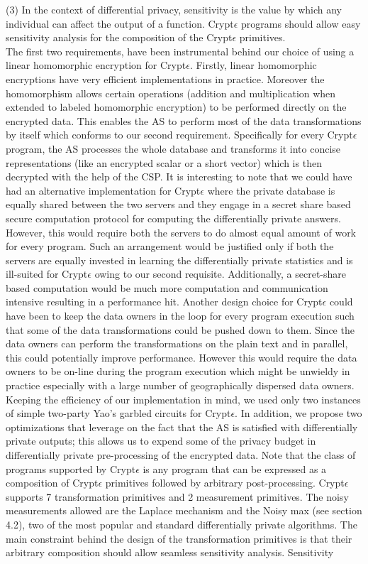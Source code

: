 (3) In the context of differential privacy, sensitivity is the value by which any individual can affect the output of a function. Crypt$\epsilon$ programs should allow easy sensitivity analysis for the composition of the Crypt$\epsilon$ primitives. \\
The first two requirements, have been instrumental behind our choice of using a linear homomorphic encryption for Crypt$\epsilon$. Firstly, linear homomorphic encryptions have very efficient implementations in practice. Moreover the homomorphism allows certain operations (addition and multiplication when extended to labeled homomorphic encryption) to be performed directly on the encrypted data. This enables the \textsf{AS} to perform most of the data transformations by itself which conforms to  our second requirement. Specifically for every Crypt$\epsilon$ program, the \textsf{AS} processes the whole database and transforms it into concise representations (like an encrypted scalar or a short vector) which is then decrypted with the help of the \textsf{CSP}. It is interesting to note that we could have had an alternative implementation for Crypt$\epsilon$ where the private database is equally shared between the two servers and they engage in a secret share based secure computation protocol for computing the differentially private answers. However, this would require both the servers to do almost equal amount of work for every program. Such an arrangement would be justified only if both the servers are equally invested in learning the differentially private statistics and is ill-suited for Crypt$\epsilon$ owing to our second requisite. Additionally, a secret-share based computation would be much more computation and communication intensive resulting in a performance hit. Another design choice for Crypt$\epsilon$ could have been to keep the data owners in the loop for every program execution such that some of the data transformations could be pushed down to them. Since the data owners can perform the transformations on the plain text and in parallel, this could potentially improve performance. However this would require the data owners to be on-line during the program execution which might be unwieldy in practice especially with a large number of geographically dispersed data owners.  Keeping the efficiency of our implementation in mind, we used only two instances of simple two-party Yao's garbled circuits for Crypt$\epsilon$. In addition, we propose two optimizations that leverage on the fact that the \textsf{AS} is satisfied with differentially private outputs; this allows  us to expend some of the privacy budget in differentially private pre-processing of the encrypted data. Note that the class of programs supported by Crypt$\epsilon$ is any program that can be expressed as a composition of  Crypt$\epsilon$ primitives followed by arbitrary post-processing. Crypt$\epsilon$ supports 7 transformation primitives and 2 measurement primitives. The noisy measurements allowed are the Laplace mechanism and the Noisy max (see section 4.2), two of the most popular and standard differentially private algorithms. The main constraint behind the design of the transformation primitives is that their arbitrary composition should allow seamless sensitivity analysis.  Sensitivity 